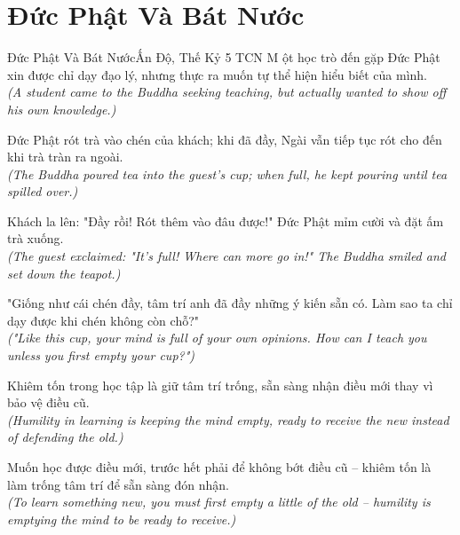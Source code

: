 \section{Đức Phật Và Bát Nước}
\begin{truyen}{Đức Phật Và Bát Nước}{Ấn Độ, Thế Kỷ 5 TCN}
M ột học trò đến gặp Đức Phật xin được chỉ dạy đạo lý, nhưng thực ra muốn tự thể hiện hiểu biết của mình.\\
\textit{(A student came to the Buddha seeking teaching, but actually wanted to show off his own knowledge.)}

Đức Phật rót trà vào chén của khách; khi đã đầy, Ngài vẫn tiếp tục rót cho đến khi trà tràn ra ngoài.\\
\textit{(The Buddha poured tea into the guest's cup; when full, he kept pouring until tea spilled over.)}

Khách la lên: "Đầy rồi! Rót thêm vào đâu được!" Đức Phật mỉm cười và đặt ấm trà xuống.\\
\textit{(The guest exclaimed: "It's full! Where can more go in!" The Buddha smiled and set down the teapot.)}

"Giống như cái chén đầy, tâm trí anh đã đầy những ý kiến sẵn có. Làm sao ta chỉ dạy được khi chén không còn chỗ?"\\
\textit{("Like this cup, your mind is full of your own opinions. How can I teach you unless you first empty your cup?")}

Khiêm tốn trong học tập là giữ tâm trí trống, sẵn sàng nhận điều mới thay vì bảo vệ điều cũ.\\
\textit{(Humility in learning is keeping the mind empty, ready to receive the new instead of defending the old.)}

\end{truyen}
\begin{baihoc}
  Muốn học được điều mới, trước hết phải để không bớt điều cũ -- khiêm tốn là làm trống tâm trí để sẵn sàng đón nhận.\\
  \textit{(To learn something new, you must first empty a little of the old -- humility is emptying the mind to be ready to receive.)}
\end{baihoc}
